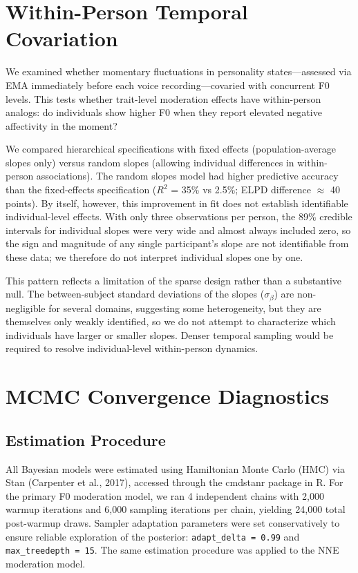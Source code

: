 \documentclass[
  english,
  man,floatsintext]{apa6}
\begin{document}
\newpage

\section{Within-Person Temporal Covariation}\label{within-person-temporal-covariation}

We examined whether momentary fluctuations in personality states---assessed via EMA immediately before each voice recording---covaried with concurrent F0 levels. This tests whether trait-level moderation effects have within-person analogs: do individuals show higher F0 when they report elevated negative affectivity in the moment?

We compared hierarchical specifications with fixed effects (population-average slopes only) versus random slopes (allowing individual differences in within-person associations). The random slopes model had higher predictive accuracy than the fixed-effects specification (\(R^2\) = 35\% vs 2.5\%; ELPD difference \(\approx\) 40 points). By itself, however, this improvement in fit does not establish identifiable individual-level effects. With only three observations per person, the 89\% credible intervals for individual slopes were very wide and almost always included zero, so the sign and magnitude of any single participant's slope are not identifiable from these data; we therefore do not interpret individual slopes one by one.

This pattern reflects a limitation of the sparse design rather than a substantive null. The between-subject standard deviations of the slopes (\(\sigma_\beta\)) are non-negligible for several domains, suggesting some heterogeneity, but they are themselves only weakly identified, so we do not attempt to characterize which individuals have larger or smaller slopes. Denser temporal sampling would be required to resolve individual-level within-person dynamics.

\newpage

\section{MCMC Convergence Diagnostics}\label{mcmc-convergence-diagnostics}

\subsection{Estimation Procedure}\label{estimation-procedure}

All Bayesian models were estimated using Hamiltonian Monte Carlo (HMC) via Stan (Carpenter et al., 2017), accessed through the cmdstanr package in R. For the primary F0 moderation model, we ran 4 independent chains with 2,000 warmup iterations and 6,000 sampling iterations per chain, yielding 24,000 total post-warmup draws. Sampler adaptation parameters were set conservatively to ensure reliable exploration of the posterior: \texttt{adapt\_delta\ =\ 0.99} and \texttt{max\_treedepth\ =\ 15}. The same estimation procedure was applied to the NNE moderation model.
\end{document}
